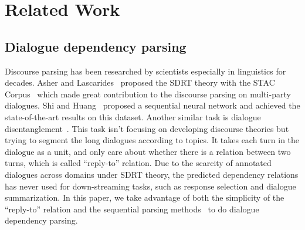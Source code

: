 \section{Related Work}
\label{sec:relatedwork}
\subsection{Dialogue dependency parsing}
Discourse parsing has been researched by scientists especially in linguistics for decades. 
Asher and Lascarides~ proposed the SDRT theory with the STAC Corpus~\cite{AsherHMBA16} which made great contribution to the discourse parsing on multi-party dialogues. Shi and Huang~ proposed a sequential neural network and achieved the state-of-the-art results on this dataset. Another similar task is dialogue disentanglement~\cite{DuPX17}. This task isn't focusing on developing discourse theories but trying to segment the long dialogues according to topics. It takes each turn in the dialogue as a unit, and only care about whether there is a relation between two turns, which is called ``reply-to'' relation. Due to the scarcity of annotated dialogues across domains under SDRT theory, the predicted dependency relations has never used for down-streaming tasks, such as response selection and dialogue summarization. In this paper, we take advantage of both the simplicity of the ``reply-to'' relation and the sequential parsing methods~\cite{ShiH19} to do dialogue dependency parsing. 



